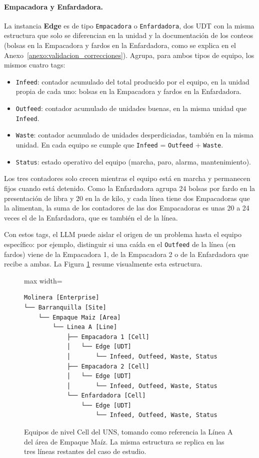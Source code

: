 \paragraph{Empacadora y Enfardadora.} La instancia \textbf{Edge} es de tipo \texttt{Empacadora} o \texttt{Enfardadora}, dos UDT con la misma estructura que solo se diferencian en la unidad y la documentación de los conteos (bolsas en la Empacadora y fardos en la Enfardadora, como se explica en el Anexo~\ref{anexo:validacion_correcciones}). Agrupa, para ambos tipos de equipo, los mismos cuatro tags:
\begin{itemize}
    \item \texttt{Infeed}: contador acumulado del total producido por el equipo, en la unidad propia de cada uno: bolsas en la Empacadora y fardos en la Enfardadora.
    \item \texttt{Outfeed}: contador acumulado de unidades buenas, en la misma unidad que \texttt{Infeed}.
    \item \texttt{Waste}: contador acumulado de unidades desperdiciadas, también en la misma unidad. En cada equipo se cumple que \texttt{Infeed} = \texttt{Outfeed} + \texttt{Waste}.
    \item \texttt{Status}: estado operativo del equipo (marcha, paro, alarma, mantenimiento).
\end{itemize}

Los tres contadores solo crecen mientras el equipo está en marcha y permanecen fijos cuando está detenido. Como la Enfardadora agrupa 24 bolsas por fardo en la presentación de libra y 20 en la de kilo, y cada línea tiene dos Empacadoras que la alimentan, la suma de los contadores de las dos Empacadoras es unas 20 a 24 veces el de la Enfardadora, que es también el de la línea.

Con estos tags, el LLM puede aislar el origen de un problema hasta el equipo específico: por ejemplo, distinguir si una caída en el \texttt{Outfeed} de la línea (en fardos) viene de la Empacadora 1, de la Empacadora 2 o de la Enfardadora que recibe a ambas. La Figura \ref{fig:uns_tree_equipos} resume visualmente esta estructura.

\begin{figure}[H]
\centering
\begin{adjustbox}{max width=\columnwidth}
\begin{BVerbatim}
Molinera [Enterprise]
└── Barranquilla [Site]
    └── Empaque Maiz [Area]
        └── Linea A [Line]
            ├── Empacadora 1 [Cell]
            │   └── Edge [UDT]
            │       └── Infeed, Outfeed, Waste, Status
            ├── Empacadora 2 [Cell]
            │   └── Edge [UDT]
            │       └── Infeed, Outfeed, Waste, Status
            └── Enfardadora [Cell]
                └── Edge [UDT]
                    └── Infeed, Outfeed, Waste, Status
\end{BVerbatim}
\end{adjustbox}
\vspace{0.3cm}
\caption{Equipos de nivel Cell del UNS, tomando como referencia la
Línea A del área de Empaque Maíz. La misma estructura se replica en
las tres líneas restantes del caso de estudio.}
\label{fig:uns_tree_equipos}
\end{figure}

